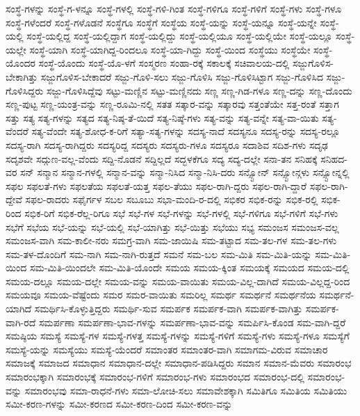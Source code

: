 {ಸಂಸ್ಥೆ-ಗಳನ್ನು
ಸಂಸ್ಥೆ-ಗ-ಳನ್ನೂ
ಸಂಸ್ಥೆ-ಗಳಲ್ಲಿ
ಸಂಸ್ಥೆ-ಗಳಿ-ಗಿಂತ
ಸಂಸ್ಥೆ-ಗಳಿಗೂ
ಸಂಸ್ಥೆ-ಗಳಿಗೆ
ಸಂಸ್ಥೆ-ಗಳು
ಸಂಸ್ಥೆ-ಗಳೂ
ಸಂಸ್ಥೆ-ಗಳೆಂದರೆ
ಸಂಸ್ಥೆ-ಗಳೊಡನೆ
ಸಂಸ್ಥೆಗೂ
ಸಂಸ್ಥೆಗೆ
ಸಂಸ್ಥೆಯ
ಸಂಸ್ಥೆ-ಯನ್ನು
ಸಂಸ್ಥೆ-ಯನ್ನೂ
ಸಂಸ್ಥೆ-ಯನ್ನೇ
ಸಂಸ್ಥೆ-ಯಲ್ಲಿ
ಸಂಸ್ಥೆ-ಯಲ್ಲಿದ್ದ
ಸಂಸ್ಥೆ-ಯಲ್ಲಿದ್ದಾಗ
ಸಂಸ್ಥೆ-ಯಲ್ಲಿದ್ದು
ಸಂಸ್ಥೆ-ಯಲ್ಲಿಯೂ
ಸಂಸ್ಥೆ-ಯಲ್ಲಿಯೇ
ಸಂಸ್ಥೆ-ಯಲ್ಲೂ
ಸಂಸ್ಥೆ-ಯಲ್ಲೇ
ಸಂಸ್ಥೆ-ಯಾಗಿ
ಸಂಸ್ಥೆ-ಯಾಗಿದ್ದ-ರಿಂದಲೂ
ಸಂಸ್ಥೆ-ಯಾ-ಗಿದ್ದು
ಸಂಸ್ಥೆ-ಯಿಂದ
ಸಂಸ್ಥೆಯು
ಸಂಸ್ಥೆಯೇ
ಸಂಸ್ಥೆ-ಯೊಂದರ
ಸಂಸ್ಥೆ-ಯೊಂದು
ಸಂಸ್ಥೆ-ಯೊ-ಳಗೆ
ಸಂಸ್ಮರಣ
ಸಂಹಾ-ರಕ್ಕೆ
ಸಕಾಲಕ್ಕೆ
ಸಚಿವಾಲಯ-ದಲ್ಲಿ
ಸಜ್ಜುಗೊಳಿಸ-ಬೇಕಾಗಿತ್ತು
ಸಜ್ಜುಗೊಳಿಸ-ಬೇಕಾದರೆ
ಸಜ್ಜು-ಗೊಳಿ-ಸಲು
ಸಜ್ಜು-ಗೊಳಿಸಿ
ಸಜ್ಜು-ಗೊಳಿಸಿಟ್ಟಾಗ
ಸಜ್ಜು-ಗೊಳಿಸಿದ
ಸಜ್ಜು-ಗೊಳಿಸಿದ್ದರು
ಸಜ್ಜು-ಗೊಳಿಸಿದ್ದೆವು
ಸಟ್ಟು-ಮಣ್ಣಿನ
ಸಟ್ಟು-ಮಣ್ಣಿನದು
ಸಣ್ಣ
ಸಣ್ಣ-ಗಿಡ-ಗಳೂ
ಸಣ್ಣ-ದನ್ನು
ಸಣ್ಣ-ದೊಂದು
ಸಣ್ಣ-ಪುಟ್ಟ
ಸಣ್ಣ-ಯಂತ್ರ-ವನ್ನು
ಸಣ್ಣ-ರೂಮಿ-ನಲ್ಲಿ
ಸತತ
ಸತ್ಕಾರ-ವನ್ನು
ಸತ್ಕಾರವು
ಸತ್ತಂತೆಯೇ
ಸತ್ತ-ರಂತೆ
ಸತ್ತಾಗ
ಸತ್ತು
ಸತ್ಯ
ಸತ್ಯ-ಗಳನ್ನು
ಸತ್ಯದ
ಸತ್ಯ-ನಿಷ್ಠ-ತೆ-ಯಿದೆ
ಸತ್ಯ-ನಿಷ್ಠೆ-ಗಳು
ಸತ್ಯ-ವನ್ನು
ಸತ್ಯ-ವನ್ನೇ
ಸತ್ಯ-ವಾ-ಯಿತು
ಸತ್ಯ-ವೆಂದರೆ
ಸತ್ಯ-ವೆಂದೇ
ಸತ್ಯ-ಶೋಧ-ಕ-ರಿಗೆ
ಸತ್ಯಾ-ಸತ್ಯ-ಗಳನ್ನು
ಸದಸ್ಯ-ನಾದೆ
ಸದಸ್ಯನೂ
ಸದಸ್ಯ-ರನ್ನು
ಸದಸ್ಯ-ರಲ್ಲೂ
ಸದಸ್ಯ-ರಾಗಿ
ಸದಸ್ಯ-ರಾಗಿದ್ದರು
ಸದಸ್ಯರಿದ್ದ
ಸದಸ್ಯರು
ಸದಸ್ಯರು-ಗಳೂ
ಸದಸ್ಯರೂ
ಸದಾಶಿವ
ಸದಿಶ-ಗಳು
ಸದೃಢ
ಸದೃಶವೇ
ಸದ್ಗುಣ-ವಲ್ಲ-ವೆಂದು
ಸದ್ದಿ-ನೊಡನೆ
ಸದ್ದಿಲ್ಲದೆ
ಸದ್ಭಳಕೆಗೂ
ಸದ್ಯ
ಸದ್ಯ-ದಲ್ಲೇ
ಸನಾ-ತನ
ಸನಿಹಕ್ಕೆ
ಸನಿಹದ-ವರ
ಸನ್
ಸನ್ಮಾನ
ಸನ್ಮಾನ-ಗಳಲ್ಲಿ
ಸನ್ಮಾನ-ವನ್ನು
ಸನ್ಮಾ-ನಿಸಿದ
ಸನ್ಮಾ-ನಿಸಿ-ದರು
ಸನ್ಸ್ಟೋನ್
ಸನ್ಸ್ಟೋನ್ಗಳು
ಸನ್ಸ್ಟೋನ್ನಲ್ಲಿ
ಸಫಲ
ಸಫಲತೆ-ಗಳು
ಸಫಲತೆಯ
ಸಫಲತೆ-ಯತ್ತ
ಸಫಲ-ತೆಯು
ಸಫಲ-ರಾಗಿ-ದ್ದರು
ಸಫಲ-ರಾಗಿ-ದ್ದಾರೆ
ಸಫಲ-ರಾಗಿ-ದ್ದೇವೆ
ಸಫಲ-ರಾದರು
ಸಫೈರ್ಗಳ
ಸಬಲ
ಸಬೂಬು
ಸಭಾ-ಮಂದಿ-ರ-ದಲ್ಲಿ
ಸಭಿಕರ
ಸಭಿಕ-ರನ್ನು
ಸಭಿಕ-ರಲ್ಲಿ
ಸಭಿಕ-ರಿಂದ
ಸಭಿಕ-ರಿಗೆ
ಸಭಿಕ-ರೆಲ್ಲ-ರಿಗೂ
ಸಭೆ
ಸಭೆ-ಗಳ
ಸಭೆ-ಗಳನ್ನು
ಸಭೆ-ಗಳಲ್ಲಿ
ಸಭೆ-ಗಳಿಗೂ
ಸಭೆ-ಗಳಿಗೆ
ಸಭೆ-ಗಳು
ಸಭೆಗೆ
ಸಭೆಯ
ಸಭೆ-ಯನ್ನು
ಸಭೆ-ಯಲ್ಲಿ
ಸಭೆ-ಯಾಗಿತ್ತು
ಸಭೆ-ಯಿತ್ತು
ಸಭೆಯು
ಸಭ್ಯ
ಸಮಂಜಸ
ಸಮಂಜಸ-ವಲ್ಲ
ಸಮಂಜಸ-ವಾಗಿ
ಸಮ-ಕಾಲೀ-ನರು
ಸಮಗ್ರ-ವಾಗಿ
ಸಮ-ಜಾಯಿಷಿ
ಸಮ-ತಟ್ಟಾದ
ಸಮ-ತಲ-ಗಳ
ಸಮ-ತಲ-ಗಳು
ಸಮ-ತಳ-ದೊಂದಿಗೆ
ಸಮ-ನಾಗಿ
ಸಮ-ನಾಗಿ-ರುತ್ತದೆ
ಸಮನೆ
ಸಮ-ಬಲ
ಸಮ-ಮಿತಿ
ಸಮ-ಮಿತಿ-ಯನ್ನು
ಸಮ-ಮಿತಿ-ಯಿಂದ
ಸಮ-ಮಿತಿ-ಯಿಂದಲೇ
ಸಮ-ಮಿತಿ-ಯೊಂದೇ
ಸಮಯ
ಸಮಯ-ಕ್ಕಿಂತ
ಸಮಯಕ್ಕೆ
ಸಮಯದ
ಸಮಯ-ದಲ್ಲಿ
ಸಮಯ-ದಲ್ಲೂ
ಸಮಯ-ದಲ್ಲೇ
ಸಮಯ-ವನ್ನು
ಸಮಯ-ವಾಯಿತು
ಸಮಯ-ವಿಲ್ಲ-ದಾಗಿದೆ
ಸಮಯ-ವಿಲ್ಲದ್ದ-ರಿಂದ
ಸಮಯವೂ
ಸಮಯ-ವೆಷ್ಟೆಂದು
ಸಮರ
ಸಮರ-ವಾಯಿತು
ಸಮರಿಲ್ಲ
ಸಮರ್ಥ
ಸಮರ್ಥನೆ
ಸಮರ್ಥನೆಯ
ಸಮರ್ಥನೆ-ಯಾಗಿದೆ
ಸಮರ್ಥಿಸಿ-ಕೊಳ್ಳುತ್ತಿದ್ದರು
ಸಮರ್ಥಿ-ಸುವ
ಸಮರ್ಪಕ
ಸಮರ್ಪಕ-ವಾಗಿ
ಸಮರ್ಪಕ-ವಾಗಿತ್ತು
ಸಮರ್ಪಕ-ವಾಗಿ-ರದೆ
ಸಮರ್ಪಣಾ
ಸಮರ್ಪಣಾ-ಭಾವ-ಗಳನ್ನು
ಸಮರ್ಪಣಾ-ಭಾವ-ವನ್ನು
ಸಮರ್ಪಿಸಿ-ಕೊಂಡ
ಸಮ-ವಾಗಿ-ದ್ದರೆ
ಸಮಷ್ಠಿಯ
ಸಮಸ್ಯೆ
ಸಮಸ್ಯೆ-ಗಳ
ಸಮಸ್ಯೆ-ಗಳತ್ತ
ಸಮಸ್ಯೆ-ಗಳನ್ನು
ಸಮಸ್ಯೆ-ಗಳಿಗೆ
ಸಮಸ್ಯೆ-ಗಳು
ಸಮಸ್ಯೆ-ಗಳೂ
ಸಮಸ್ಯೆಗೆ
ಸಮಸ್ಯೆ-ಯನ್ನು
ಸಮಸ್ಯೆಯು
ಸಮಸ್ಯೆ-ಯೆಂದರೆ
ಸಮಾಂತರ
ಸಮಾಂತರ-ವಾಗಿ
ಸಮಾಗಮ-ವಿರುವ
ಸಮಾಚಾರ
ಸಮಾಜಕ್ಕೆ
ಸಮಾಜದ
ಸಮಾಧಾನ
ಸಮಾಧಾನ-ದಲ್ಲೇ
ಸಮಾಧಾನ-ಪಡಿಸಿದ್ದರು
ಸಮಾನ
ಸಮಾನ-ಮೆವರು
ಸಮಾರಂಭ
ಸಮಾರಂಭಕ್ಕಾಗಿ
ಸಮಾರಂಭಕ್ಕೆ
ಸಮಾರಂಭ-ಗಳಿಗೆ
ಸಮಾರಂಭ-ಗಳು
ಸಮಾರಂಭದ
ಸಮಾರಂಭ-ದಲ್ಲಿ
ಸಮಾರಂಭ-ವನ್ನು
ಸಮಾರಂಭವು
ಸಮಾ-ರಾಧನೆ-ಗಳು
ಸಮಾ-ಲೋಚಿ-ಸಲು
ಸಮಾವೇಶಕ್ಕಾಗಿ
ಸಮಿತಿಗೂ
ಸಮಿತಿಯ
ಸಮಿತಿಯು
ಸಮೀ-ಕರಣ-ಗಳನ್ನು
ಸಮೀ-ಕರಣದ
ಸಮೀ-ಕರಣ-ದಿಂದ
ಸಮೀ-ಕರಣ-ವನ್ನು
}
